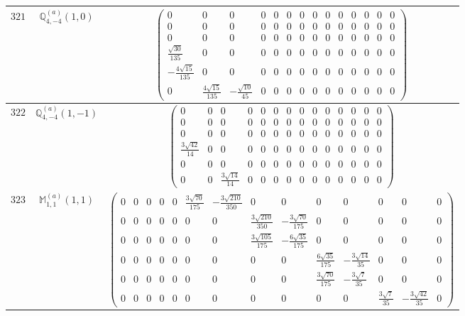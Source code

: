 \documentclass[fleqn,8pt,landscape]{jsarticle}
\begin{document}
\begin{center}
\begin{longtable}{ccc}
$ 321 $ & $ \mathbb{Q}_{4,-4}^{(a)}(1,0) $ & $ \begin{pmatrix} 0 & 0 & 0 & 0 & 0 & 0 & 0 & 0 & 0 & 0 & 0 & 0 & 0 & 0 \\ 0 & 0 & 0 & 0 & 0 & 0 & 0 & 0 & 0 & 0 & 0 & 0 & 0 & 0 \\ 0 & 0 & 0 & 0 & 0 & 0 & 0 & 0 & 0 & 0 & 0 & 0 & 0 & 0 \\ \frac{\sqrt{30}}{135} & 0 & 0 & 0 & 0 & 0 & 0 & 0 & 0 & 0 & 0 & 0 & 0 & 0 \\ - \frac{4 \sqrt{15}}{135} & 0 & 0 & 0 & 0 & 0 & 0 & 0 & 0 & 0 & 0 & 0 & 0 & 0 \\ 0 & \frac{4 \sqrt{15}}{135} & - \frac{\sqrt{10}}{45} & 0 & 0 & 0 & 0 & 0 & 0 & 0 & 0 & 0 & 0 & 0 \end{pmatrix} $ \\ \hline
$ 322 $ & $ \mathbb{Q}_{4,-4}^{(a)}(1,-1) $ & $ \begin{pmatrix} 0 & 0 & 0 & 0 & 0 & 0 & 0 & 0 & 0 & 0 & 0 & 0 & 0 & 0 \\ 0 & 0 & 0 & 0 & 0 & 0 & 0 & 0 & 0 & 0 & 0 & 0 & 0 & 0 \\ 0 & 0 & 0 & 0 & 0 & 0 & 0 & 0 & 0 & 0 & 0 & 0 & 0 & 0 \\ \frac{3 \sqrt{42}}{14} & 0 & 0 & 0 & 0 & 0 & 0 & 0 & 0 & 0 & 0 & 0 & 0 & 0 \\ 0 & 0 & 0 & 0 & 0 & 0 & 0 & 0 & 0 & 0 & 0 & 0 & 0 & 0 \\ 0 & 0 & \frac{3 \sqrt{14}}{14} & 0 & 0 & 0 & 0 & 0 & 0 & 0 & 0 & 0 & 0 & 0 \end{pmatrix} $ \\ \hline
$ 323 $ & $ \mathbb{M}_{1,1}^{(a)}(1,1) $ & $ \begin{pmatrix} 0 & 0 & 0 & 0 & 0 & \frac{3 \sqrt{70}}{175} & - \frac{3 \sqrt{210}}{350} & 0 & 0 & 0 & 0 & 0 & 0 & 0 \\ 0 & 0 & 0 & 0 & 0 & 0 & 0 & \frac{3 \sqrt{210}}{350} & - \frac{3 \sqrt{70}}{175} & 0 & 0 & 0 & 0 & 0 \\ 0 & 0 & 0 & 0 & 0 & 0 & 0 & \frac{3 \sqrt{105}}{175} & - \frac{6 \sqrt{35}}{175} & 0 & 0 & 0 & 0 & 0 \\ 0 & 0 & 0 & 0 & 0 & 0 & 0 & 0 & 0 & \frac{6 \sqrt{35}}{175} & - \frac{3 \sqrt{14}}{35} & 0 & 0 & 0 \\ 0 & 0 & 0 & 0 & 0 & 0 & 0 & 0 & 0 & \frac{3 \sqrt{70}}{175} & - \frac{3 \sqrt{7}}{35} & 0 & 0 & 0 \\ 0 & 0 & 0 & 0 & 0 & 0 & 0 & 0 & 0 & 0 & 0 & \frac{3 \sqrt{7}}{35} & - \frac{3 \sqrt{42}}{35} & 0 \end{pmatrix} $ \\ \hline

\end{longtable}
\end{center}
\end{document}

